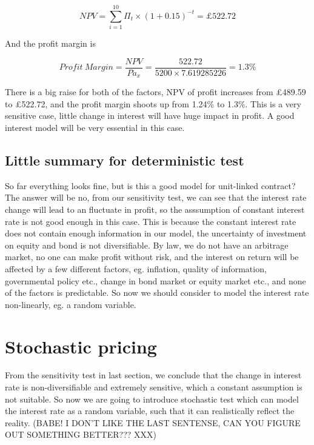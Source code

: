 \documentclass{report}
\begin{document}
\[
 NPV=\sum_{i=1}^{10} \Pi_t \times (1+0.15)^{-t} = \pounds522.72
\]
 
And the profit margin is 


\[
Profit\ Margin =  \frac{NPV}{P \ddot{a}_x} = \frac{522.72}{5200 \times 7.619285226} = 1.3\%
\]

There is a big raise for both of the factors, NPV of profit increases from \pounds489.59 to \pounds522.72, and the profit margin shoots up from 1.24\% to 1.3\%. This is a very sensitive case, little change in interest will have huge impact in profit. A good interest model will be very essential in this case.
 





\subsection{Little summary for deterministic test}
So far everything looks fine, but is this a good model for unit-linked contract? The answer will be no, from our sensitivity test, we can see that the interest rate change will lead to an fluctuate in profit, so the asssumption of constant interest rate is not good enough in this case. This is because the constant interest rate does not contain  enough information in our model, the uncertainty of investment on equity and bond is not diversifiable. By law, we do not have an arbitrage market, no one can make profit without risk, and the interest on return will be affected by a few different factors, \cite{bib:riskfactor} eg. inflation, quality of information, governmental policy etc., change in bond market or equity market etc., and none of the factors is predictable. So now we should consider to model the interest rate non-linearly, eg. a random variable. 




\section{Stochastic pricing}

From the sensitivity test in last section, we conclude that the change in interest rate is non-diversifiable and extremely sensitive, which a constant assumption is not suitable. So now we are going to introduce stochastic test which can model the interest rate as a random variable, such that it can realistically reflect the reality.  (BABE! I DON'T LIKE THE LAST SENTENSE, CAN YOU FIGURE OUT SOMETHING BETTER??? XXX)
\end{document}
